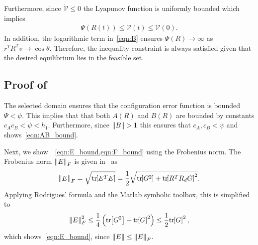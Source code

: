 \documentclass[fleqn]{IJCAS}  %
\begin{document}
\begin{multicols}{2}
Furthermore, since \( \dot{\mathcal{V}} \leq 0 \) the Lyapunov function is uniformly bounded which implies 
\begin{align*}
	\Psi(R(t)) \leq \mathcal{V}(t) \leq \mathcal{V}(0) .
\end{align*}
In addition, the logarithmic term in~\cref{eqn:B} ensures \( \Psi(R) \to \infty \) as \( r^T R^T v \to \cos \theta \).
Therefore, the inequality constraint is always satisfied given that the desired equilibrium lies in the feasible set.
	
\subsection{Proof of~}\label{proof:eR_dot_bound}
The selected domain ensures that the configuration error function is bounded \( \Psi < \psi \).
This implies that that both \( A(R) \) and \( B(R) \) are bounded by constants \( c_A c_B < \psi < h_1\).
Furthermore, since \( \left\| B \right\| > 1 \) this ensures that \( c_A, c_B < \psi\) and shows~\cref{eqn:AB_bound}.

Next, we show~~\cref{eqn:E_bound,eqn:F_bound} using the Frobenius norm.
The Frobenius norm \( \left\| E \right\|_F \) is given in~\cite{LeeITCST13} as
\begin{gather*}
	\left\| E \right\|_F = \sqrt{\mathrm{tr}\negthickspace\left[ E^T E \right]} = \frac{1}{2} \sqrt{\mathrm{tr}\negthickspace\left[ G^2 \right] + \mathrm{tr}\negthickspace\left[ R^T R_d G \right]^2} .
\end{gather*}
Applying Rodrigues' formula and the Matlab symbolic toolbox, this is simplified to
\begin{gather*}
	\left\| E \right\|^2_F \leq \frac{1}{4} \left( \mathrm{tr}\negthickspace\left[ G^2 \right] + \mathrm{tr}\negthickspace\left[ G \right]^2 \right) \leq \frac{1}{2} \mathrm{tr}\negthickspace\left[ G \right]^2 ,
\end{gather*}
which shows~\cref{eqn:E_bound}, since \( \left\| E \right\| \leq \left\| E \right\|_F \).


\end{multicols}
\end{document}
